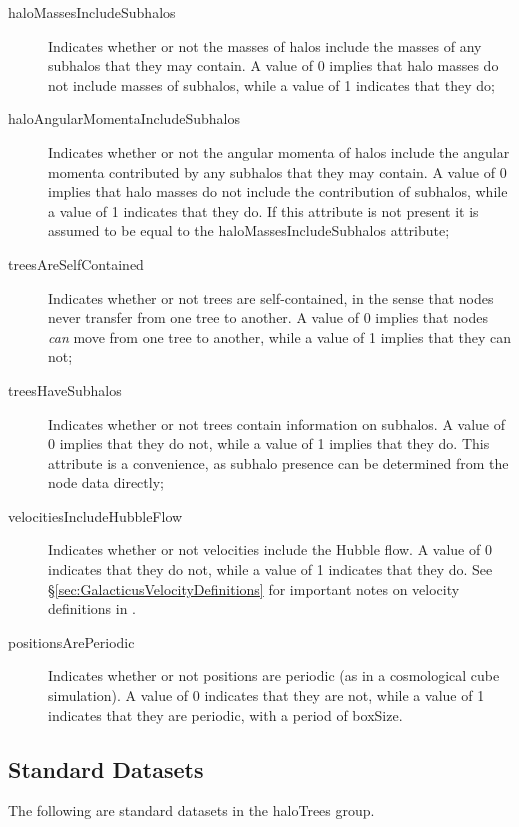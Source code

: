 \begin{description}
 \item [{\normalfont \ttfamily haloMassesIncludeSubhalos}] Indicates whether or not the masses of halos include the masses of any subhalos that they may contain. A value of 0 implies that halo masses do not include masses of subhalos, while a value of 1 indicates that they do;
 \item [{\normalfont \ttfamily haloAngularMomentaIncludeSubhalos}] Indicates whether or not the angular momenta of halos include the angular momenta contributed by any subhalos that they may contain. A value of 0 implies that halo masses do not include the contribution of subhalos, while a value of 1 indicates that they do. If this attribute is not present it is assumed to be equal to the {\normalfont \ttfamily haloMassesIncludeSubhalos} attribute;
 \item [{\normalfont \ttfamily treesAreSelfContained}] Indicates whether or not trees are self-contained, in the sense that nodes never transfer from one tree to another. A value of 0 implies that nodes \emph{can} move from one tree to another, while a value of 1 implies that they can not;
 \item [{\normalfont \ttfamily treesHaveSubhalos}] Indicates whether or not trees contain information on subhalos. A value of 0 implies that they do not, while a value of 1 implies that they do. This attribute is a convenience, as subhalo presence can be determined from the node data directly;
 \item [{\normalfont \ttfamily velocitiesIncludeHubbleFlow}] Indicates whether or not velocities include the Hubble flow. A value of 0 indicates that they do not, while a value of 1 indicates that they do. See \S\ref{sec:GalacticusVelocityDefinitions} for important notes on velocity definitions in \glc.
 \item [{\normalfont \ttfamily positionsArePeriodic}] Indicates whether or not positions are periodic (as in a cosmological cube simulation). A value of 0 indicates that they are not, while a value of 1 indicates that they are periodic, with a period of {\normalfont \ttfamily boxSize}.
\end{description}

\subsection{Standard Datasets}

The following are standard datasets in the {\normalfont \ttfamily haloTrees} group.

